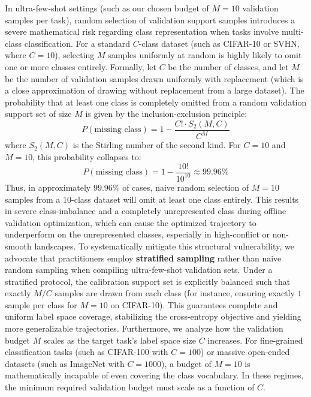 In ultra-few-shot settings (such as our chosen budget of $M=10$ validation samples per task), random selection of validation support samples introduces a severe mathematical risk regarding class representation when tasks involve multi-class classification.
For a standard $C$-class dataset (such as CIFAR-10 or SVHN, where $C=10$), selecting $M$ samples uniformly at random is highly likely to omit one or more classes entirely.
Formally, let $C$ be the number of classes, and let $M$ be the number of validation samples drawn uniformly with replacement (which is a close approximation of drawing without replacement from a large dataset).
The probability that at least one class is completely omitted from a random validation support set of size $M$ is given by the inclusion-exclusion principle:
\begin{equation}
\label{eq:missing_class}
P(\text{missing class}) = 1 - \frac{C! \cdot S_2(M, C)}{C^M}
\end{equation}
where $S_2(M, C)$ is the Stirling number of the second kind.
For $C=10$ and $M=10$, this probability collapses to:
\begin{equation}
P(\text{missing class}) = 1 - \frac{10!}{10^{10}} \approx 99.96\%
\end{equation}
Thus, in approximately $99.96\%$ of cases, naive random selection of $M=10$ samples from a 10-class dataset will omit at least one class entirely.
This results in severe class-imbalance and a completely unrepresented class during offline validation optimization, which can cause the optimized trajectory to underperform on the unrepresented classes, especially in high-conflict or non-smooth landscapes.
To systematically mitigate this structural vulnerability, we advocate that practitioners employ \textbf{stratified sampling} rather than naive random sampling when compiling ultra-few-shot validation sets.
Under a stratified protocol, the calibration support set is explicitly balanced such that exactly $M / C$ samples are drawn from each class (for instance, ensuring exactly $1$ sample per class for $M=10$ on CIFAR-10).
This guarantees complete and uniform label space coverage, stabilizing the cross-entropy objective and yielding more generalizable trajectories.
Furthermore, we analyze how the validation budget $M$ scales as the target task's label space size $C$ increases.
For fine-grained classification tasks (such as CIFAR-100 with $C=100$) or massive open-ended datasets (such as ImageNet with $C=1000$), a budget of $M=10$ is mathematically incapable of even covering the class vocabulary.
In these regimes, the minimum required validation budget must scale as a function of $C$.
